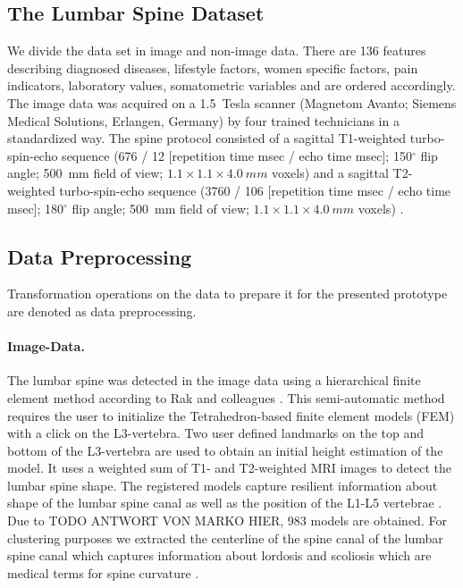 \documentclass[journal]{style/vgtc} 			          %
\begin{document}
\subsection{The Lumbar Spine Dataset}
We divide the data set in image and non-image data.
%
There are 136 features describing diagnosed diseases, lifestyle factors, women specific factors, pain indicators, laboratory values, somatometric variables and are ordered accordingly.
%
The image data was acquired on a 1.5~Tesla scanner (Magnetom Avanto; Siemens Medical Solutions, Erlangen, Germany) by four trained technicians in a standardized way.
%
The spine protocol consisted of a sagittal T1-weighted turbo-spin-echo sequence (676 / 12 [repetition time msec / echo time msec]; 150$^\circ$ flip angle; 500~mm field of view; $1.1\times1.1\times4.0~mm$ voxels) and a sagittal T2-weighted turbo-spin-echo sequence (3760 / 106 [repetition time msec / echo time msec]; 180$^\circ$ flip angle; 500~mm field of view; $1.1\times1.1\times4.0~mm$ voxels) \cite{Hegenscheid2013}.

\subsection{Data Preprocessing} \label{Data Preprocessing}
Transformation operations on the data to prepare it for the presented prototype are denoted as data preprocessing.
%
\paragraph{Image-Data.} \label{Image-Data}
The lumbar spine was detected in the image data using a hierarchical finite element method according to Rak and colleagues \cite{Rak2013}.
%
This semi-automatic method requires the user to initialize the Tetrahedron-based finite element models (FEM) with a click on the L3-vertebra.
%
Two user defined landmarks on the top and bottom of the L3-vertebra are used to obtain an initial height estimation of the model.
%
It uses a weighted sum of T1- and T2-weighted MRI images to detect the lumbar spine shape.
%
The registered models capture resilient information about shape of the lumbar spine canal as well as the position of the L1-L5 vertebrae \cite{Klemm2013VMV}.
%
Due to TODO ANTWORT VON MARKO HIER, 983 models are obtained.
%
For clustering purposes we extracted the centerline of the spine canal of the lumbar spine canal which captures information about lordosis and scoliosis which are medical terms for spine curvature \cite{Klemm2013VMV}.
\end{document}
